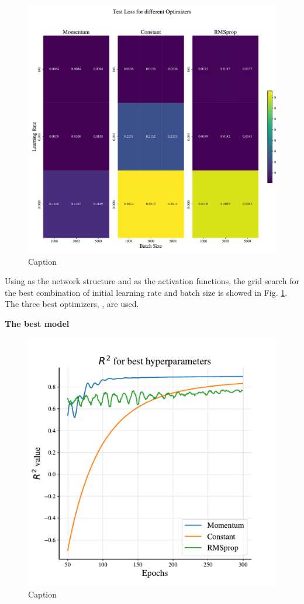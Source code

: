 \begin{figure}
    \centering
    \includegraphics[width=1.0\linewidth]{project_2/figures/Loss_grid_continuous.pdf}
    \caption{Caption}
    \label{fig:grid_franke}
\end{figure}

Using  as the network structure and  as the activation functions, the grid search for the best combination of initial learning rate and batch size is showed in Fig. \ref{fig:grid_franke}. The three best optimizers, , are used. 

\textbf{The best model}

\begin{figure}
    \centering
    \includegraphics[width=1.0\linewidth]{project_2/figures/best_continuous.pdf}
    \caption{Caption}
    \label{fig:best_franke}
\end{figure}

